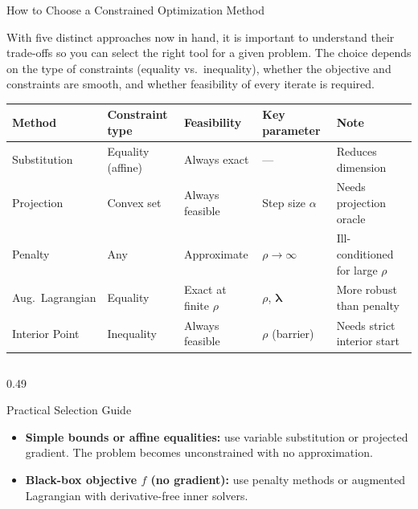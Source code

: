 \documentclass[aspectratio=169,10pt]{beamer}
\newcommand{\blambda}{\bm{\lambda}}
\begin{document}
\begin{frame}[allowframebreaks]{How to Choose a Constrained Optimization Method}

  With five distinct approaches now in hand, it is important to understand
  their trade-offs so you can select the right tool for a given problem.  The
  choice depends on the type of constraints (equality vs.\ inequality),
  whether the objective and constraints are smooth, and whether feasibility
  of every iterate is required.

  \vspace{8pt}
  \renewcommand{\arraystretch}{1.4}
  \begin{tabular}{lllll}
    \toprule
    \textbf{Method}         & \textbf{Constraint type} & \textbf{Feasibility} & \textbf{Key parameter} & \textbf{Note} \\
    \midrule
    Substitution            & Equality (affine)        & Always exact        & ---                   & Reduces dimension \\
    Projection              & Convex set               & Always feasible     & Step size $\alpha$    & Needs projection oracle \\
    Penalty                 & Any                      & Approximate         & $\rho \to \infty$     & Ill-conditioned for large $\rho$ \\
    Aug.\ Lagrangian        & Equality                 & Exact at finite $\rho$ & $\rho$, $\blambda$ & More robust than penalty \\
    Interior Point          & Inequality               & Always feasible     & $\rho$ (barrier)      & Needs strict interior start \\
    \bottomrule
  \end{tabular}

  \vspace{10pt}

  \begin{columns}
    \begin{column}{0.49\textwidth}
      \begin{block}{Practical Selection Guide}
        \begin{itemize}
          \item \textbf{Simple bounds or affine equalities:} use
                variable substitution or projected gradient.  The problem
                becomes unconstrained with no approximation.

          \item \textbf{Black-box objective $f$ (no gradient):} use penalty
                methods or augmented Lagrangian with derivative-free
                inner solvers.


\end{itemize}
\end{block}
\end{column}
\end{columns}
\end{frame}
\end{document}
